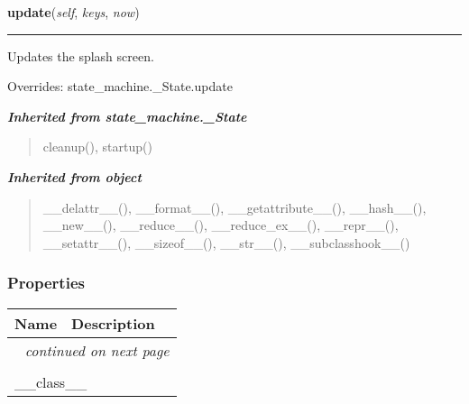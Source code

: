     \vspace{0.5ex}

\hspace{.8\funcindent}\begin{boxedminipage}{\funcwidth}

    \raggedright \textbf{update}(\textit{self}, \textit{keys}, \textit{now})

    \vspace{-1.5ex}

    \rule{\textwidth}{0.5\fboxrule}
\setlength{\parskip}{2ex}
    Updates the splash screen.

\setlength{\parskip}{1ex}
      Overrides: state\_machine.\_State.update

    \end{boxedminipage}


\large{\textbf{\textit{Inherited from state\_machine.\_State}}}

\begin{quote}
cleanup(), startup()
\end{quote}

\large{\textbf{\textit{Inherited from object}}}

\begin{quote}
\_\_delattr\_\_(), \_\_format\_\_(), \_\_getattribute\_\_(), \_\_hash\_\_(), \_\_new\_\_(), \_\_reduce\_\_(), \_\_reduce\_ex\_\_(), \_\_repr\_\_(), \_\_setattr\_\_(), \_\_sizeof\_\_(), \_\_str\_\_(), \_\_subclasshook\_\_()
\end{quote}


  \subsubsection{Properties}

    \vspace{-1cm}
\hspace{\varindent}\begin{longtable}{|p{\varnamewidth}|p{\vardescrwidth}|l}
\cline{1-2}
\cline{1-2} \centering \textbf{Name} & \centering \textbf{Description}& \\
\cline{1-2}
\endhead\cline{1-2}\multicolumn{3}{r}{\small\textit{continued on next page}}\\\endfoot\cline{1-2}
\endlastfoot\multicolumn{2}{|l|}{\textit{Inherited from object}}\\
\multicolumn{2}{|p{\varwidth}|}{\raggedright \_\_class\_\_}\\
\cline{1-2}
\end{longtable}

